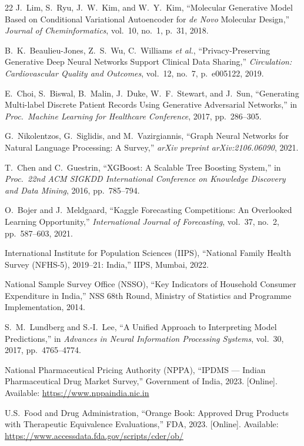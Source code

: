 \documentclass[10pt,journal,compsoc]{IEEEtran}
\newcommand{\etal}{\textit{et al.}}
\begin{document}
\begin{thebibliography}{22}
J.~Lim, S.~Ryu, J.~W.~Kim, and W.~Y.~Kim,
``Molecular Generative Model Based on Conditional Variational Autoencoder for
\textit{de Novo} Molecular Design,''
\textit{Journal of Cheminformatics},
vol.~10, no.~1, p.~31, 2018.

B.~K.~Beaulieu-Jones, Z.~S.~Wu, C.~Williams \etal,
``Privacy-Preserving Generative Deep Neural Networks Support Clinical Data Sharing,''
\textit{Circulation: Cardiovascular Quality and Outcomes},
vol.~12, no.~7, p.~e005122, 2019.

E.~Choi, S.~Biswal, B.~Malin, J.~Duke, W.~F.~Stewart, and J.~Sun,
``Generating Multi-label Discrete Patient Records Using Generative Adversarial
Networks,''
in \textit{Proc.\ Machine Learning for Healthcare Conference}, 2017, pp.~286--305.

G.~Nikolentzos, G.~Siglidis, and M.~Vazirgiannis,
``Graph Neural Networks for Natural Language Processing: A Survey,''
\textit{arXiv preprint arXiv:2106.06090}, 2021.

T.~Chen and C.~Guestrin,
``XGBoost: A Scalable Tree Boosting System,''
in \textit{Proc.\ 22nd ACM SIGKDD International Conference on Knowledge Discovery
and Data Mining}, 2016, pp.~785--794.

O.~Bojer and J.~Meldgaard,
``Kaggle Forecasting Competitions: An Overlooked Learning Opportunity,''
\textit{International Journal of Forecasting},
vol.~37, no.~2, pp.~587--603, 2021.

International Institute for Population Sciences (IIPS),
``National Family Health Survey (NFHS-5), 2019--21: India,''
IIPS, Mumbai, 2022.

National Sample Survey Office (NSSO),
``Key Indicators of Household Consumer Expenditure in India,''
NSS 68th Round, Ministry of Statistics and Programme Implementation, 2014.

S.~M.~Lundberg and S.-I.~Lee,
``A Unified Approach to Interpreting Model Predictions,''
in \textit{Advances in Neural Information Processing Systems},
vol.~30, 2017, pp.~4765--4774.

National Pharmaceutical Pricing Authority (NPPA),
``IPDMS --- Indian Pharmaceutical Drug Market Survey,''
Government of India, 2023.
[Online]. Available: \url{https://www.nppaindia.nic.in}

U.S.\ Food and Drug Administration,
``Orange Book: Approved Drug Products with Therapeutic Equivalence Evaluations,''
FDA, 2023.
[Online]. Available: \url{https://www.accessdata.fda.gov/scripts/cder/ob/}

\end{thebibliography}
\end{document}
